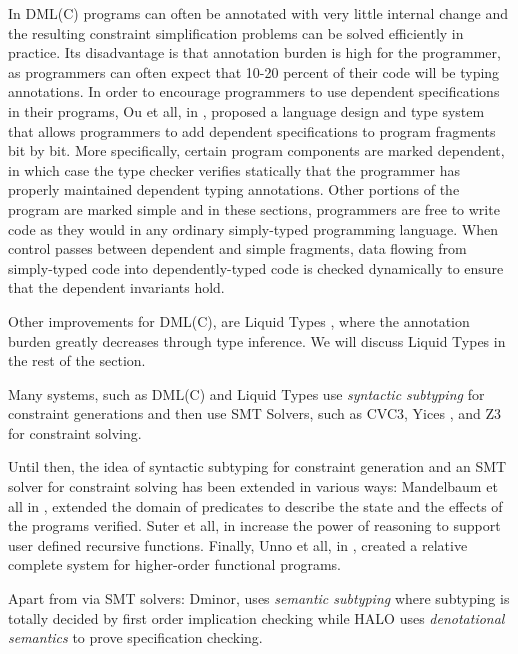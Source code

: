 In DML(C) programs can often be annotated with
very little internal change and the resulting
constraint simplification problems can be solved efficiently
in practice. 
%
Its disadvantage is that annotation burden is high for the programmer,  
as programmers can often expect that 10-20 percent of
their code will be typing annotations.
%
In order to encourage programmers to use dependent specifications in their programs,
Ou et all, in \cite{Ou2004}, proposed a language design and type system that allows programmers to add
dependent specifications to program fragments bit by bit. 
More specifically, certain program components are marked dependent, 
in which case the type checker verifies
statically that the programmer has properly maintained dependent typing annotations.
Other portions of the program are marked simple and in these sections, programmers
are free to write code as they would in any ordinary simply-typed programming language. When control passes between dependent and simple fragments, data flowing
from simply-typed code into dependently-typed code is checked dynamically to ensure that the dependent invariants hold.

Other improvements for DML(C), are Liquid Types \cite{LiquidPLDI08}, 
where the annotation burden greatly decreases through type inference.
We will discuss Liquid Types in the rest of the section.

Many systems, such as DML(C) and Liquid Types use \textit{syntactic subtyping} for constraint 
generations and then use SMT Solvers, such as CVC3\cite{CVC3}, Yices \cite{Yices}, and Z3 \cite{z3}
 for constraint solving.

Until then, the idea of syntactic subtyping for constraint generation
and an SMT solver for constraint solving has been extended in various ways:
%
Mandelbaum et all in \cite{MandelbaumWalker03},
extended the domain of predicates to describe the state 
and the effects of the programs verified.
%
Suter et all, in \cite{SuterKK11} increase the power of reasoning 
to support user defined recursive functions.
Finally,  Unno et all, in \cite{UnnoTK13},
created a relative complete system for higher-order functional programs.
 
Apart from via SMT solvers:
Dminor, \cite{dminor} uses \textit{semantic subtyping} where subtyping is totally 
decided by first order implication checking while 
HALO \cite{VytiniotisJCR13} uses \textit{denotational semantics}
to prove specification checking.




